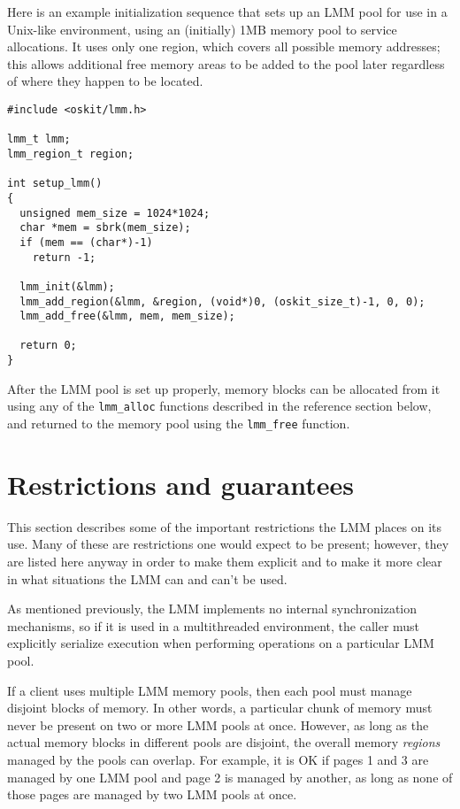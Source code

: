 Here is an example initialization sequence
that sets up an LMM pool for use in a Unix-like environment,
using an (initially) 1MB memory pool to service allocations.
It uses only one region, which covers all possible memory addresses;
this allows additional free memory areas to be added to the pool later
regardless of where they happen to be located.
\begin{verbatim}
#include <oskit/lmm.h>

lmm_t lmm;
lmm_region_t region;

int setup_lmm()
{
  unsigned mem_size = 1024*1024;
  char *mem = sbrk(mem_size);
  if (mem == (char*)-1)
    return -1;

  lmm_init(&lmm);
  lmm_add_region(&lmm, &region, (void*)0, (oskit_size_t)-1, 0, 0);
  lmm_add_free(&lmm, mem, mem_size);

  return 0;
}
\end{verbatim}

After the LMM pool is set up properly,
memory blocks can be allocated from it
using any of the {\tt lmm_alloc} functions
described in the reference section below,
and returned to the memory pool using the {\tt lmm_free} function.

\section{Restrictions and guarantees}

This section describes some of the important restrictions
the LMM places on its use.
Many of these are restrictions one would expect to be present;
however, they are listed here anyway in order to make them explicit
and to make it more clear in what situations the LMM can and can't be used.

As mentioned previously,
the LMM implements no internal synchronization mechanisms,
so if it is used in a multithreaded environment,
the caller must explicitly serialize execution
when performing operations on a particular LMM pool.

If a client uses multiple LMM memory pools,
then each pool must manage disjoint blocks of memory.
In other words, a particular chunk of memory
must never be present on two or more LMM pools at once.
However, as long as the actual memory blocks in different pools are disjoint,
the overall memory \emph{regions} managed by the pools can overlap.
For example, it is OK if pages 1 and 3 are managed by one LMM pool
and page 2 is managed by another,
as long as none of those pages are managed by two LMM pools at once.

